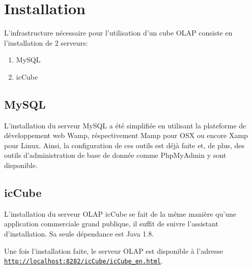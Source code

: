 \chapter{Installation}

L'infrastructure nécessaire pour l'utilisation d'un cube OLAP consiste en l'installation de 2 serveurs:

\begin{enumerate}
	\item MySQL
	\item icCube
\end{enumerate}

\section{MySQL}

L'installation du serveur MySQL a été simplifiée en utilisant la plateforme de développement web Wamp, réspectivement Mamp pour OSX ou encore Xamp pour Linux.
Ainsi, la configuration de ces outils est déjà faite et, de plus, des outils d'administration de base de donnée comme PhpMyAdmin y sont disponible.

\section{icCube}

L'installation du serveur OLAP icCube se fait de la même manière qu'une application commerciale grand publique, il suffit de suivre l'assistant d'installation. Sa seule dépendance est Java 1.8. 

Une fois l'installation faite, le serveur OLAP est disponible à l'adresse \texttt{\url{http://localhost:8282/icCube/icCube_en.html}}.
